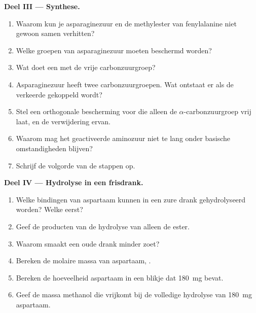\begin{problem}
\medskip
\noindent\textbf{Deel III --- Synthese.}
\begin{enumerate}[resume]
  \item Waarom kun je asparaginezuur en de methylester van fenylalanine niet gewoon samen verhitten?
  \item Welke groepen van asparaginezuur moeten beschermd worden?
  \item Wat doet een  met de vrije carbonzuurgroep?
  \item Asparaginezuur heeft twee carbonzuurgroepen. Wat ontstaat er als de verkeerde gekoppeld wordt?
  \item Stel een orthogonale bescherming voor die alleen de $\alpha$-carbonzuurgroep vrij laat, en de
        verwijdering ervan.
  \item Waarom mag het geactiveerde aminozuur niet te lang onder basische omstandigheden blijven?
  \item Schrijf de volgorde van de stappen op.
\end{enumerate}

\medskip
\noindent\textbf{Deel IV --- Hydrolyse in een frisdrank.}
\begin{enumerate}[resume]
  \item Welke bindingen van aspartaam kunnen in een zure drank gehydrolyseerd worden? Welke eerst?
  \item Geef de producten van de hydrolyse van alleen de ester.
  \item Waarom smaakt een oude drank minder zoet?
  \item Bereken de molaire massa van aspartaam, .
  \item Bereken de hoeveelheid aspartaam in een blikje dat \qty{180}{mg} bevat.
  \item Geef de massa methanol die vrijkomt bij de volledige hydrolyse van \qty{180}{mg}
        aspartaam.
\end{enumerate}
\end{problem}
